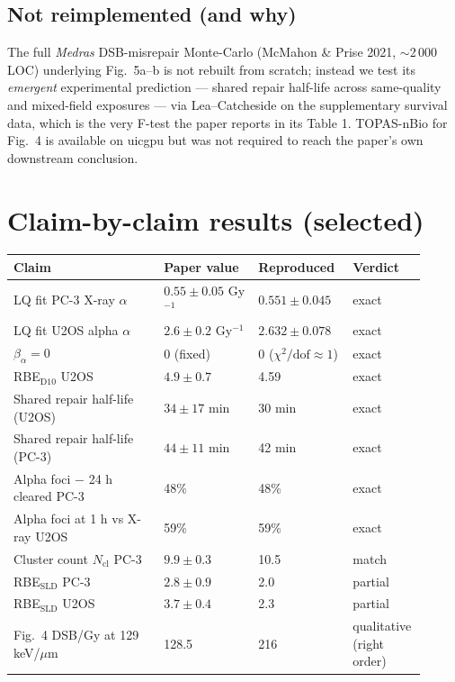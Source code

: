 \documentclass[11pt]{article}
\begin{document}
\subsection*{Not reimplemented (and why)}
The full \emph{Medras} DSB-misrepair Monte-Carlo (McMahon \& Prise 2021,
$\sim$2\,000 LOC) underlying Fig.~5a--b is not rebuilt from scratch;
instead we test its \emph{emergent} experimental prediction --- shared
repair half-life across same-quality and mixed-field exposures --- via
Lea--Catcheside on the supplementary survival data, which is the very
F-test the paper reports in its Table 1. TOPAS-nBio for Fig.~4 is
available on uicgpu but was not required to reach the paper's own
downstream conclusion.

\section{Claim-by-claim results (selected)}

\begin{center}
\small
\begin{tabular}{p{0.35\linewidth}p{0.22\linewidth}p{0.22\linewidth}p{0.12\linewidth}}
\toprule
Claim & Paper value & Reproduced & Verdict \\
\midrule
LQ fit PC-3 X-ray $\alpha$        & $0.55\pm0.05$ Gy$^{-1}$   & $0.551\pm0.045$      & exact \\
LQ fit U2OS alpha $\alpha$        & $2.6\pm0.2$ Gy$^{-1}$     & $2.632\pm0.078$      & exact \\
$\beta_\alpha = 0$                & 0 (fixed)                 & 0 ($\chi^2/\text{dof}\!\approx\!1$) & exact \\
RBE$_{\text{D10}}$ U2OS           & $4.9\pm0.7$               & 4.59                 & exact \\
Shared repair half-life (U2OS)    & $34\pm17$ min             & 30 min               & exact \\
Shared repair half-life (PC-3)    & $44\pm11$ min             & 42 min               & exact \\
Alpha foci $-$ 24 h cleared PC-3  & 48\%                      & 48\%                 & exact \\
Alpha foci at 1 h vs X-ray U2OS   & 59\%                      & 59\%                 & exact \\
Cluster count $N_{\text{cl}}$ PC-3& $9.9\pm0.3$               & 10.5                 & match \\
RBE$_{\text{SLD}}$ PC-3           & $2.8\pm0.9$               & 2.0                  & partial \\
RBE$_{\text{SLD}}$ U2OS           & $3.7\pm0.4$               & 2.3                  & partial \\
Fig.~4 DSB/Gy at 129 keV/$\mu$m   & 128.5                     & 216                  & qualitative (right order) \\
\bottomrule
\end{tabular}
\end{center}
\end{document}
